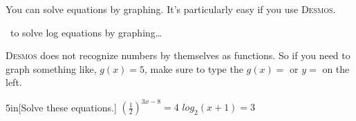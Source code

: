 You can solve equations by graphing.
It's particularly easy if you use {\scshape Desmos}.

\begin{myConceptSteps}{~to solve log equations by graphing\dots}
\end{myConceptSteps}

\begin{myCenteredBox}[width=4.5in]
    {\scshape Desmos} does not recognize numbers by themselves as functions. 
    So if you need to graph something like, $g(x) = 5$, make sure to type the $g(x) =$ 
    or $y=$ on the left.
\end{myCenteredBox}



\begin{my2Problems}{5in}[Solve these equations.]
    {
        $\left(\frac{1}{2}\right)^{3x-8} = 4$
    }
    {
        $log_2(x+1) = 3$
    }
\end{my2Problems}
